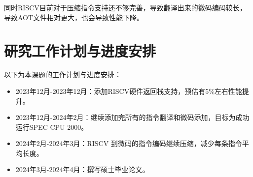 \documentclass{Style/ucasproposal}%
\begin{document}
同时RISCV目前对于压缩指令支持还不够完善，导致翻译出来的微码编码较长，导致AOT文件相对更大，也会导致性能下降。

\section{研究工作计划与进度安排}

以下为本课题的工作计划与进度安排：

\begin{itemize}
  \item 2023年12月-2023年12月：添加RISCV硬件返回栈支持，预估有5\%左右性能提升。
  \item 2023年12月-2024年2月：继续添加完所有的指令翻译和微码添加，目标为成功运行SPEC CPU 2000。
  \item 2024年2月-2024年3月：RISCV 到微码的指令编码继续压缩，减少每条指令平均长度。
  \item 2024年3月-2024年4月：撰写硕士毕业论文。
\end{itemize}





\end{document}
